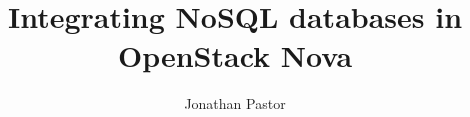 \documentclass{report}
\begin{document}


\title{Integrating NoSQL databases in OpenStack Nova}
\author{Jonathan Pastor}


\maketitle

\tableofcontents
















\end{document}
